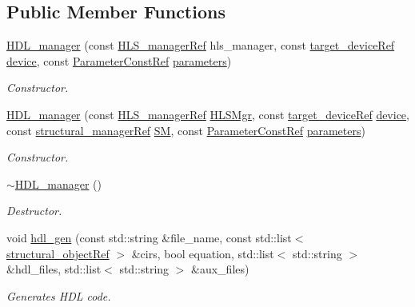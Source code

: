 \subsection*{Public Member Functions}
\begin{DoxyCompactItemize}
\item 
\hyperlink{classHDL__manager_a55652cd604850136dde5693069e6c890}{H\+D\+L\+\_\+manager} (const \hyperlink{hls__manager_8hpp_acd3842b8589fe52c08fc0b2fcc813bfe}{H\+L\+S\+\_\+manager\+Ref} hls\+\_\+manager, const \hyperlink{target__device_8hpp_acedb2b7a617e27e6354a8049fee44eda}{target\+\_\+device\+Ref} \hyperlink{classHDL__manager_a39fc9442d1cb94063f582ea205251c4b}{device}, const \hyperlink{Parameter_8hpp_a37841774a6fcb479b597fdf8955eb4ea}{Parameter\+Const\+Ref} \hyperlink{classHDL__manager_a45df650b0a63aaf4771fd72ffa22bfa5}{parameters})
\begin{DoxyCompactList}\small\item\em Constructor. \end{DoxyCompactList}\item 
\hyperlink{classHDL__manager_a7798274aa9ff6b40af902d6356ef2f46}{H\+D\+L\+\_\+manager} (const \hyperlink{hls__manager_8hpp_acd3842b8589fe52c08fc0b2fcc813bfe}{H\+L\+S\+\_\+manager\+Ref} \hyperlink{classHDL__manager_a97f281a1319403619497d1d3fec65787}{H\+L\+S\+Mgr}, const \hyperlink{target__device_8hpp_acedb2b7a617e27e6354a8049fee44eda}{target\+\_\+device\+Ref} \hyperlink{classHDL__manager_a39fc9442d1cb94063f582ea205251c4b}{device}, const \hyperlink{structural__manager_8hpp_ab3136f0e785d8535f8d252a7b53db5b5}{structural\+\_\+manager\+Ref} \hyperlink{classHDL__manager_ad3199056804702202557a71f2d78d14e}{SM}, const \hyperlink{Parameter_8hpp_a37841774a6fcb479b597fdf8955eb4ea}{Parameter\+Const\+Ref} \hyperlink{classHDL__manager_a45df650b0a63aaf4771fd72ffa22bfa5}{parameters})
\begin{DoxyCompactList}\small\item\em Constructor. \end{DoxyCompactList}\item 
\hyperlink{classHDL__manager_a4ee4c8c0fa6151e95741b6adc10b58f1}{$\sim$\+H\+D\+L\+\_\+manager} ()
\begin{DoxyCompactList}\small\item\em Destructor. \end{DoxyCompactList}\item 
void \hyperlink{classHDL__manager_a0884dfde508d0a59bc176d65b51fc5b7}{hdl\+\_\+gen} (const std\+::string \&file\+\_\+name, const std\+::list$<$ \hyperlink{structural__objects_8hpp_a8ea5f8cc50ab8f4c31e2751074ff60b2}{structural\+\_\+object\+Ref} $>$ \&cirs, bool equation, std\+::list$<$ std\+::string $>$ \&hdl\+\_\+files, std\+::list$<$ std\+::string $>$ \&aux\+\_\+files)
\begin{DoxyCompactList}\small\item\em Generates H\+DL code. \end{DoxyCompactList}\end{DoxyCompactItemize}
